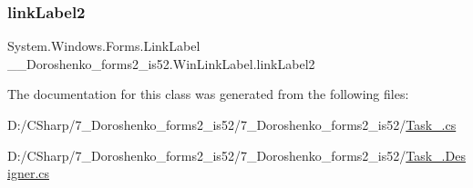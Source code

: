 \subsubsection{\texorpdfstring{link\+Label2}{linkLabel2}}
{\footnotesize\ttfamily System.\+Windows.\+Forms.\+Link\+Label \+\_\+\_\+\+Doroshenko\+\_\+forms2\+\_\+is52.\+Win\+Link\+Label.\+link\+Label2\hspace{0.3cm}{\ttfamily [private]}}



The documentation for this class was generated from the following files\+:\begin{DoxyCompactItemize}
\item 
D\+:/\+C\+Sharp/7\+\_\+\+Doroshenko\+\_\+forms2\+\_\+is52/7\+\_\+\+Doroshenko\+\_\+forms2\+\_\+is52/\hyperlink{_task__6_8cs}{Task\+\_.\+cs}\item 
D\+:/\+C\+Sharp/7\+\_\+\+Doroshenko\+\_\+forms2\+\_\+is52/7\+\_\+\+Doroshenko\+\_\+forms2\+\_\+is52/\hyperlink{_task__6_8_designer_8cs}{Task\+\_.\+Designer.\+cs}\end{DoxyCompactItemize}

